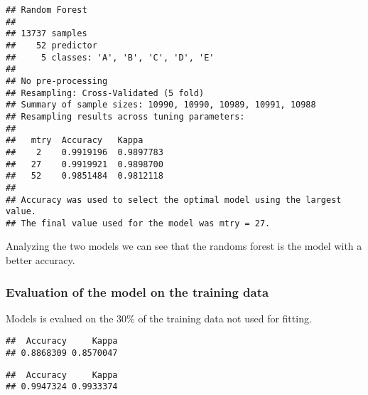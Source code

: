 \documentclass[]{article}
\newenvironment{Shaded}{\begin{snugshade}}{\end{snugshade}}
\newcommand{\KeywordTok}[1]{\textcolor[rgb]{0.13,0.29,0.53}{\textbf{#1}}}
\newcommand{\StringTok}[1]{\textcolor[rgb]{0.31,0.60,0.02}{#1}}
\newcommand{\OperatorTok}[1]{\textcolor[rgb]{0.81,0.36,0.00}{\textbf{#1}}}
\newcommand{\NormalTok}[1]{#1}
\begin{document}
\begin{verbatim}
## Random Forest 
## 
## 13737 samples
##    52 predictor
##     5 classes: 'A', 'B', 'C', 'D', 'E' 
## 
## No pre-processing
## Resampling: Cross-Validated (5 fold) 
## Summary of sample sizes: 10990, 10990, 10989, 10991, 10988 
## Resampling results across tuning parameters:
## 
##   mtry  Accuracy   Kappa    
##    2    0.9919196  0.9897783
##   27    0.9919921  0.9898700
##   52    0.9851484  0.9812118
## 
## Accuracy was used to select the optimal model using the largest value.
## The final value used for the model was mtry = 27.
\end{verbatim}

Analyzing the two models we can see that the randoms forest is the model
with a better accuracy.

\subsubsection{Evaluation of the model on the training
data}\label{evaluation-of-the-model-on-the-training-data}

Models is evalued on the 30\% of the training data not used for fitting.

\begin{Shaded}
\end{Shaded}

\begin{verbatim}
##  Accuracy     Kappa 
## 0.8868309 0.8570047
\end{verbatim}

\begin{Shaded}
\end{Shaded}

\begin{verbatim}
##  Accuracy     Kappa 
## 0.9947324 0.9933374
\end{verbatim}
\end{document}
